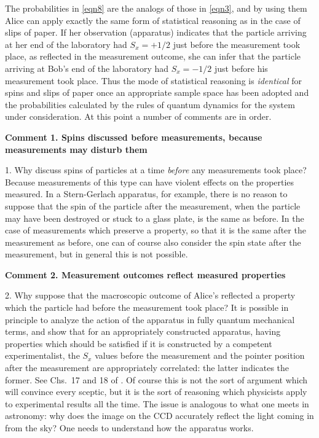 \documentclass[12pt]{article} %
\def\outl#1{\par{\medskip\noindent\hspace*{.5cm}\bf
      \mathversion{bold}#1\mathversion{normal}\smallskip} }
\def\np{} \def\xa{} \def\xb{} \def\xn{} \def\xp{}
\def\outl#1{} \def\np{} \def\xa{} \def\xb{} \def\xn{} \def\xp{}
\def\outl#1{\par{\medskip\noindent\hspace*{.5cm}\bf
      \mathversion{bold}#1\mathversion{normal}\smallskip} }
\def\np{\newpage }\def\xn{\nopagebreak }\def\xp{\pagebreak }
\begin{document}
The probabilities in \eqref{eqn8} are the analogs of those in \eqref{eqn3},
and by using them Alice can apply exactly the same form of statistical
reasoning as in the case of slips of paper.  If her observation (apparatus)
indicates that the particle arriving at her end of the laboratory had $S_x =
+1/2$ just before the measurement took place, as reflected in the measurement
outcome, she can infer that the particle arriving at Bob's end of the
laboratory had $S_x =-1/2$ just before his measurement took place. Thus the
mode of statistical reasoning is \emph{identical} for spins and slips of paper
once an appropriate sample space has been adopted and the probabilities
calculated by the rules of quantum dynamics for the system under
consideration.
%
At this point a number of comments are in order.

\xb
\outl{Comment 1. Spins discussed before measurements, because measurements may
  disturb them}
\xa


1. Why discuss spins of particles at a time \emph{before} any
measurements took place?  Because measurements of this type can have violent
effects on the properties measured.  In a Stern-Gerlach apparatus, for
example, there is no reason to suppose that the spin of the particle after the
measurement, when the particle may have been destroyed or stuck to a glass
plate, is the same as before.  In the case of measurements which preserve
a property, so that it is the same after the measurement as before, one can of
course also consider the spin state after the measurement, but in general this
is not possible.

\xb
\outl{Comment 2. Measurement outcomes reflect measured properties}
\xa



2. Why suppose that the macroscopic outcome of Alice's reflected a property
which the particle had before the measurement took place?  It is possible in
principle to analyze the action of the apparatus in fully quantum mechanical
terms, and show that for an appropriately constructed apparatus, having
properties which should be satisfied if it is constructed by a competent
experimentalist, the $S_x$ values before the measurement and the pointer
position after the measurement are appropriately correlated: the latter
indicates the former.  See Chs.~17 and 18 of \cite{Grff02c}. Of course this is
not the sort of argument which will convince every sceptic, but it is the sort
of reasoning which physicists apply to experimental results all the time.  The
issue is analogous to what one meets in astronomy: why does the image on the
CCD accurately reflect the light coming in from the sky?  One needs to
understand how the apparatus works.
\end{document}
